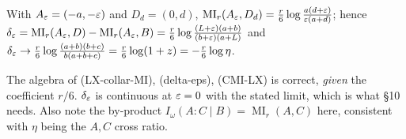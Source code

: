 \documentclass[11pt]{article}
\newcommand{\MI}{\operatorname{MI}}
\newcommand{\CMI}{I}
\begin{document}
\begin{lemma}\label{lem:deps}
With $A_\varepsilon=(-a,-\varepsilon)$ and $D_d=(0,d)$, $\MI_r(A_\eps,D_d)=\frac r6\log\frac{a(d+\eps)}{\eps(a+d)}$;
hence $\delta_\eps=\MI_r(A_\eps,D)-\MI_r(A_\eps,B)=\frac r6\log\frac{(L+\eps)(a+b)}{(b+\eps)(a+L)}$
and $\delta_\varepsilon\to\frac r6\log\frac{(a+b)(b+c)}{b(a+b+c)}=\frac r6\log(1+z)=-\frac r6\log\eta$.
\end{lemma}
\begin{verdictok}
The algebra of (LX-collar-MI), (delta-eps), (CMI-LX) is correct, \emph{given}
the coefficient $r/6$. $\delta_\varepsilon$ is continuous at $\varepsilon=0$ with the stated
limit, which is what \S10 needs. Also note the by-product
$\CMI_\omega(A:C\mid B)=\MI_r(A,C)$ here, consistent with $\eta$ being the $A,C$
cross ratio.
\end{verdictok}
\end{document}
